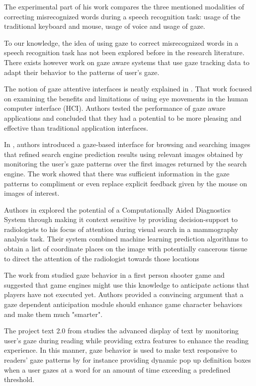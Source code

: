 \documentclass[]{article}
\begin{document}
The experimental part of his work compares the three mentioned modalities of correcting misrecognized words during  a
speech recognition task: usage of the traditional keyboard and mouse, usage of voice and usage of gaze.


To our knowledge, the idea of using gaze to correct misrecognized words in a speech recognition task has not been 
explored before in the research literature. There exists however work on gaze aware systems that use gaze tracking data
to adapt their behavior to the patterns of user's gaze.


The notion of gaze attentive interfaces is neatly explained in \cite{hyrskykari2006eyes}. That work focused on examining
the benefits and limitations of using eye movements in the human computer interface (HCI). Authors tested 
the performance of gaze aware applications and concluded that they had a potential to be more
pleasing and effective than traditional application interfaces.

 
In \cite{Kozma2009}, authors introduced a gaze-based interface for browsing and searching images that refined search
engine prediction results using relevant images obtained by monitoring the user's gaze patterns over the first images
returned by the search engine. The work showed that there was sufficient information in the gaze patterns to compliment or even replace
explicit feedback given by the mouse on images of interest. 


Authors in \cite{Tourassi2010} explored the potential of a Computationally Aided Diagnostics System through making it
context sensitive by providing decision-support to radiologists to his focus of attention during visual search in a mammography
analysis task. Their system combined machine learning prediction algorithms to obtain a list of coordinate places on the
image with potentially cancerous tissue to direct the attention of the radiologist towards those locations


The work from \cite{Koesling2011} studied gaze behavior in a first person shooter game and suggested that game engines
might use this knowledge to anticipate actions that players have not executed yet. Authors provided a convincing
argument that a gaze dependent anticipation module should enhance game character behaviors and make them much "smarter".


The project text 2.0 from \cite{Biedert2010} studies the advanced display of text by monitoring user's gaze during
reading while providing extra features to enhance the reading experience. In this manner, gaze behavior is used to
make text responsive to readers' gaze patterns by for instance providing dynamic pop up definition boxes when a user gazes at
a word for an amount of time exceeding a predefined threshold. 
\end{document}
